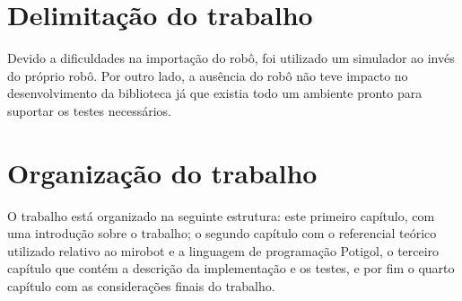 \section{Delimitação do trabalho}

Devido a dificuldades na importação do robô, foi utilizado um simulador ao
invés do próprio robô. Por outro lado, a ausência do robô não teve 
impacto no desenvolvimento da biblioteca já que existia todo um ambiente pronto
para suportar os testes necessários.


\section{Organização do trabalho}

O trabalho está organizado na seguinte estrutura: este primeiro capítulo, com uma introdução sobre o trabalho; o segundo capítulo com o referencial teórico utilizado relativo ao mirobot e a linguagem de programação Potigol, o terceiro capítulo que contém a descrição da implementação e os testes, e por fim o quarto capítulo com as considerações finais do trabalho.
